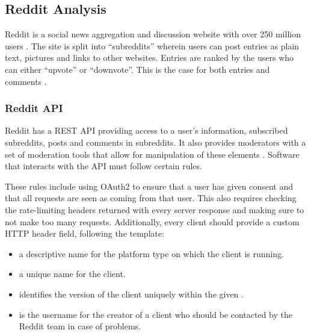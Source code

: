 \subsection{Reddit Analysis}\label{sec:reddit-analysis}
Reddit is a social news aggregation and discussion website with over 250 million
users \citep{AdvertiseOnReddit}. The site is split into ``subreddits'' wherein
users can post entries as plain text, pictures and links to other websites.
Entries are ranked by the users who can either ``upvote'' or ``downvote''. This
is the case for both entries and comments \citep{AboutReddit}.\nl


\subsubsection{Reddit API}\label{subsec:reddit-api}
Reddit has a \ac{REST} \ac{API} providing access to a user's information,
subscribed subreddits, posts and comments in subreddits. It also provides
moderators with a set of moderation tools that allow for manipulation of these
elements \citep{RedditApi}. Software that interacts with the \ac{API} must
follow certain rules.

These rules include using OAuth2 to ensure that a user has given consent and
that all requests are seen as coming from that user. This also requires checking
the rate-limiting headers returned with every server response and making sure
to not make too many requests.
Additionally, every client should provide a custom 
\ac{HTTP} header field, following the template: \citep{RedditApiRules}

\begin{center}
\end{center}\nl
\begin{itemize}
  \item {} a descriptive name for the platform type on which the
  client is running.
  \item {} a unique name for the client.
  \item {} identifies the version of the client uniquely
  within the given .
  \item {} is the username for the creator of a client who
  should be contacted by the Reddit team in case of problems.
\end{itemize}\nl

